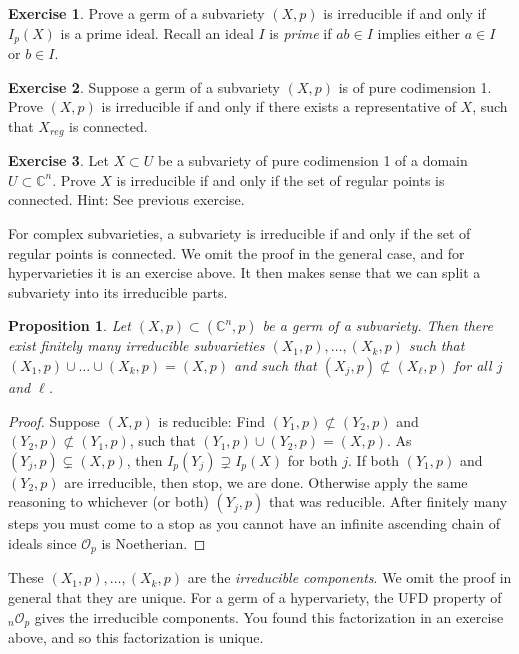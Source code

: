 \documentclass[12pt,openany]{book}
\newcommand{\C}{{\mathbb{C}}}
\newcommand{\sO}{{\mathscr{O}}}
\newcommand{\myindex}[1]{#1\index{#1}}
\theoremstyle{plain}
\newtheorem{prop}[thm]{Proposition}
\theoremstyle{remark}
\theoremstyle{definition}
\newenvironment{exbox}{%
    \def\FrameCommand{\vrule width 1pt \relax\hspace{10pt}}%
    \MakeFramed{\advance\hsize-\width\FrameRestore}%
}{%
    \endMakeFramed
}
\theoremstyle{exercise}
\newtheorem{exercise}{Exercise}[section]
\theoremstyle{example}
\newcommand{\thmref}[1]{\hyperref[#1]{Theorem~\ref*{#1}}}
\begin{document}
\begin{exbox}
\begin{exercise}
Prove a germ of a subvariety $(X,p)$ is irreducible
if and only if $I_p(X)$ is a prime ideal.
Recall an ideal $I$ is \emph{prime}
if $ab \in I$ implies either $a \in I$ or $b
\in I$.
\end{exercise}

\begin{exercise}
Suppose a germ of a subvariety $(X,p)$ is of pure codimension 1.
Prove $(X,p)$ is irreducible if and only if there
exists a representative of $X$, such that $X_{\textit{reg}}$
is connected.  %
\end{exercise}

\begin{exercise}
Let $X \subset U$ be a subvariety of pure codimension 1 of a domain $U
\subset \C^n$.
Prove $X$ is irreducible if and only if the set of regular points
is connected.  Hint: See previous exercise.
\end{exercise}
\end{exbox}

For complex subvarieties, a subvariety is irreducible if
and only if the set of regular points is connected.  We omit the proof
in the general case, and for hypervarieties it is an exercise above.
It then makes sense that we can split a subvariety into its irreducible parts.

\begin{prop}
Let $(X,p) \subset (\C^n,p)$ be a germ of a subvariety.  Then there exist
finitely many irreducible subvarieties $(X_1,p),\ldots,(X_k,p)$ such that
$(X_1,p) \cup \ldots \cup (X_k,p) = (X,p)$ and such that $(X_j,p)
\not\subset (X_\ell,p)$ for all $j$ and $\ell$.
\end{prop}

\begin{proof}
Suppose $(X,p)$ is reducible:
Find $(Y_1,p) \not\subset (Y_2,p)$ and $(Y_2,p) \not\subset (Y_1,p)$,
such that $(Y_1,p) \cup (Y_2,p) = (X,p)$.
As $(Y_j,p) \subsetneq (X,p)$, then
$I_p(Y_j) \supsetneq I_p(X)$ for both $j$.  If both
$(Y_1,p)$ and $(Y_2,p)$ are irreducible, then stop, we are done.  Otherwise
apply the same reasoning to whichever (or both) $(Y_j,p)$ that was
reducible.  After finitely many steps you must come to a stop as you cannot
have an infinite ascending chain of ideals since $\sO_p$ is Noetherian.
\end{proof}

These $(X_1,p),\ldots,(X_k,p)$ are the
\emph{\myindex{irreducible components}}.
We omit the proof in general
that they are unique.
For a germ of a hypervariety,
the UFD property of ${}_{n}\sO_p$ gives the irreducible
components.  You found this factorization in an exercise above,
and so this factorization is unique.
\end{document}
